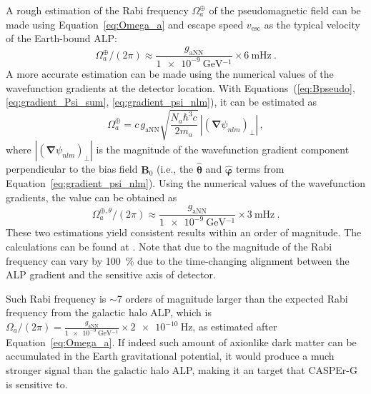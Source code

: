 A rough estimation of the Rabi frequency $\Omega_a^{\oplus}$ of the pseudomagnetic field can be made using Equation~\eqref{eq:Omega_a} and escape speed $v_\mathrm{esc}$ as the typical velocity of the Earth-bound ALP: 
\begin{equation}
    \Omega_a^{\oplus} / (2 \pi)\approx \frac{g_\mathrm{aNN}}{\SI{1e-9}{\GeV^{-1}}} \times \SI{6}{\mHz}~.
\end{equation}
A more accurate estimation can be made using the numerical values of the wavefunction gradients at the detector location. 
With Equations~(\ref{eq:Bpseudo}, \ref{eq:gradient_Psi_sum}, \ref{eq:gradient_psi_nlm}), it can be estimated as
\begin{equation}
    \Omega_a^{\oplus} = c\, g_\mathrm{aNN} \sqrt{\frac{N_a \hbar^3 c}{2 m_a}}\,\left|(\boldsymbol{\nabla}\psi_{nlm})_\perp\right|
    \,,\label{eq:Omega_a_earth}
\end{equation}
where $\left|(\boldsymbol{\nabla}\psi_{nlm})_\perp\right|$ is the magnitude of the wavefunction gradient component perpendicular to the bias field $\mathbf{B}_0$ (i.e., the $\hat{\boldsymbol{\theta}}$ and $\hat{\boldsymbol{\varphi}}$ terms from Equation~\eqref{eq:gradient_psi_nlm}).
Using the numerical values of the wavefunction gradients, the value can be obtained as
\begin{equation}
    \Omega_a^{\oplus, \theta} / (2 \pi)\approx \frac{g_\mathrm{aNN}}{\SI{1e-9}{\GeV^{-1}}} \times \SI{3}{\mHz}~.
\end{equation}
These two estimations yield consistent results within an order of magnitude. 
The calculations can be found at . %
Note that due to the magnitude of the Rabi frequency can vary by \SI{100}{\percent} due to the time-changing alignment between the ALP gradient and the sensitive axis of detector. 

Such Rabi frequency is $\sim$7 orders of magnitude larger than the expected Rabi frequency from the galactic halo ALP, which is $\Omega_a/(2\pi)=\frac{g_\mathrm{aNN}}{\SI{1e-9}{\GeV^{-1}}}\times\SI{2e-10}{\Hz}$, as estimated after Equation~\eqref{eq:Omega_a}. 
If indeed such amount of axionlike dark matter can be accumulated in the Earth gravitational potential, it would produce a much stronger signal than the galactic halo ALP, making it an target that CASPEr-G is sensitive to. 

